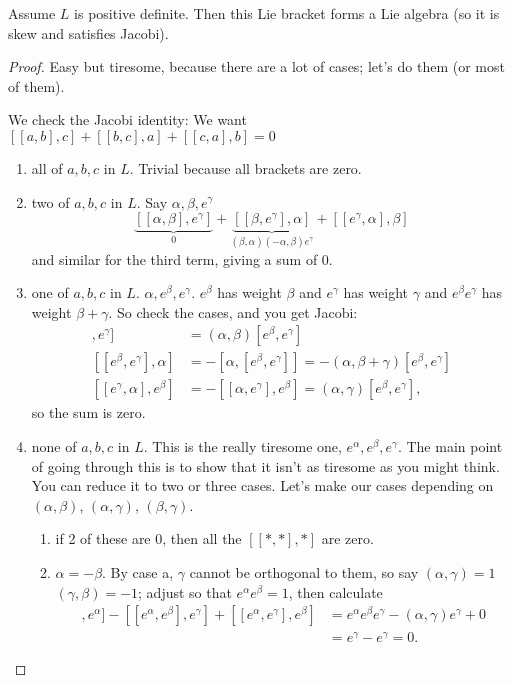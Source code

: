  \begin{theorem}
   Assume $L$ is positive definite. Then this Lie bracket forms a Lie algebra (so it
   is skew and satisfies Jacobi).
 \end{theorem}
 \begin{proof}
   Easy but tiresome, because there are a lot of cases; let's do them (or most of
   them).

   We check the Jacobi identity: We want $[[a,b],c]+[[b,c],a]+[[c,a],b]=0$
   \begin{enumerate}
     \item all of $a,b,c$ in $L$. Trivial because all brackets are zero.
     \item two of $a,b,c$ in $L$. Say $\alpha,\beta,e^\gamma$
     \[
        \underbrace{[[\alpha,\beta],e^\gamma]}_0+\underbrace{[[\beta,e^\gamma],\alpha]}_{(\beta,\alpha)(-\alpha,\beta)e^\gamma}+[[e^\gamma,\alpha],\beta]
     \]
     and similar for the third term, giving a sum of 0.

     \item one of $a,b,c$ in $L$. $\alpha,e^\beta,e^\gamma$. $e^\beta$ has weight
     $\beta$ and $e^\gamma$ has weight $\gamma$ and $e^\beta e^\gamma$ has weight
     $\beta+\gamma$. So check the cases, and you get Jacobi:
\begin{align*}
  [[\alpha,e^\beta],e^\gamma] &= (\alpha,\beta)[e^\beta,e^\gamma] \\
  [ [e^\beta,e^\gamma],\alpha] &= -[\alpha,[e^\beta,e^\gamma]] =
  -(\alpha,\beta+\gamma)[e^\beta,e^\gamma] \\
  [ [e^\gamma,\alpha],e^\beta] &= -[ [\alpha,e^\gamma],e^\beta] =
  (\alpha,\gamma)[e^\beta,e^\gamma],
\end{align*}
  so the sum is zero.

     \item none of $a,b,c$ in $L$. This is the really tiresome one,
     $e^\alpha,e^\beta,e^\gamma$. The main point of going through this is to show that
     it isn't as tiresome as you might think. You can reduce it to two or three cases.
     Let's make our cases depending on $(\alpha,\beta)$, $(\alpha,\gamma)$,
     $(\beta,\gamma)$.
     \begin{enumerate}
       \item if 2 of these are 0, then all the $[[\ast,\ast],\ast]$ are zero.

       \item $\alpha=-\beta$. By case a, $\gamma$ cannot be orthogonal to them, so say
       $(\alpha,\gamma)=1$ $(\gamma,\beta)=-1$; adjust so that $e^\alpha e^\beta=1$,
       then calculate
\begin{align*}
  [ [e^\gamma,e^\beta],e^\alpha] - [ [e^\alpha,e^\beta],e^\gamma] + [
  [e^\alpha,e^\gamma],e^\beta]
  &= e^\alpha e^\beta e^\gamma - (\alpha,\gamma)e^\gamma + 0\\
  &= e^\gamma - e^\gamma = 0.
\end{align*}


\end{enumerate}
\end{enumerate}
\end{proof}
